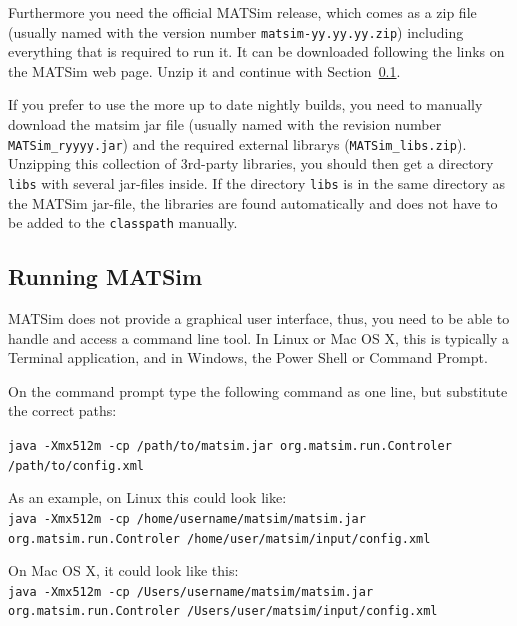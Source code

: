 Furthermore you need the official MATSim release, which comes as a zip file (usually named with the version number \lstinline|matsim-yy.yy.yy.zip|) including everything that is required to run it. It can be downloaded following the links on the MATSim web page. Unzip it and continue with Section~\ref{sec:runexample}.

If you prefer to use the more up to date nightly builds, you need to manually download the matsim jar file (usually named with the revision number \lstinline|MATSim_ryyyy.jar|) and the required external \glspl{library} (\lstinline|MATSim_libs.zip|). Unzipping this collection of 3rd-party libraries, you should then get a directory \lstinline|libs| with several jar-files inside. If the directory \lstinline|libs| is in the same directory as the MATSim jar-file, the libraries are found automatically and does not have to be added to the \lstinline|classpath| manually.

\subsection{Running MATSim}
\label{sec:runexample}


MATSim does not provide a graphical user interface, thus, you need to be able to handle and access a command line tool. In Linux or Mac OS X, this is typically a Terminal application, and in Windows, the Power Shell or Command Prompt.

On the command prompt type the following command as one line, but substitute the correct paths: 

\lstinline|java -Xmx512m -cp /path/to/matsim.jar org.matsim.run.Controler /path/to/config.xml|

As an example, on Linux this could look like: \\
\lstinline|java -Xmx512m -cp /home/username/matsim/matsim.jar org.matsim.run.Controler /home/user/matsim/input/config.xml|

On Mac OS X, it could look like this: \\
\lstinline|java -Xmx512m -cp /Users/username/matsim/matsim.jar org.matsim.run.Controler /Users/user/matsim/input/config.xml|

